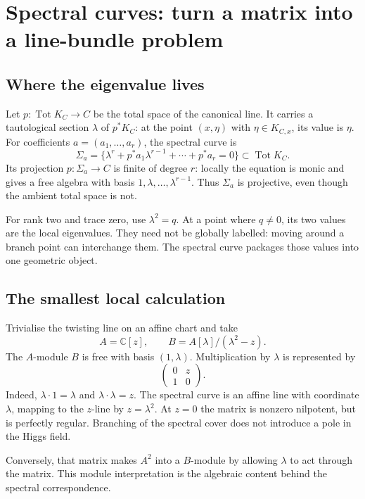 \documentclass[11pt,a4paper]{article}
\numberwithin{equation}{section}
\theoremstyle{definition}
\newcommand{\Tot}{\operatorname{Tot}}
\begin{document}
\section{Spectral curves: turn a matrix into a line-bundle problem}
\label{sec:spectral}

\subsection{Where the eigenvalue lives}
Let $p:\Tot K_C\to C$ be the total space of the canonical line.
It carries a tautological section $\lambda$ of $p^*K_C$: at the point
$(x,\eta)$ with $\eta\in K_{C,x}$, its value is $\eta$.
For coefficients $a=(a_1,\ldots,a_r)$, the spectral curve is
\begin{equation}\label{eq:spectral}
 \Sigma_a=\{\lambda^r+p^*a_1\lambda^{r-1}+\cdots+p^*a_r=0\}
 \subset\Tot K_C.
\end{equation}
Its projection $p:\Sigma_a\to C$ is finite of degree $r$: locally the
equation is monic and gives a free algebra with basis
$1,\lambda,\ldots,\lambda^{r-1}$.
Thus $\Sigma_a$ is projective, even though the ambient total space is not.

For rank two and trace zero, use $\lambda^2=q$. At a point where
$q\ne0$, its two values are the local eigenvalues. They need not be
globally labelled: moving around a branch point can interchange them.
The spectral curve packages those values into one geometric object.

\subsection{The smallest local calculation}
Trivialise the twisting line on an affine chart and take
\[
 A=\mathbb C[z],\qquad B=A[\lambda]/(\lambda^2-z).
\]
The $A$-module $B$ is free with basis $(1,\lambda)$. Multiplication
by $\lambda$ is represented by
\begin{equation}\label{eq:companion}
 \begin{pmatrix}0&z\\1&0\end{pmatrix}.
\end{equation}
Indeed, $\lambda\cdot1=\lambda$ and $\lambda\cdot\lambda=z$.
The spectral curve is an affine line with coordinate $\lambda$, mapping
to the $z$-line by $z=\lambda^2$. At $z=0$ the matrix is nonzero
nilpotent, but is perfectly regular. Branching of the spectral cover
does not introduce a pole in the Higgs field.

Conversely, that matrix makes $A^2$ into a $B$-module by allowing
$\lambda$ to act through the matrix. This module interpretation is the
algebraic content behind the spectral correspondence.
\end{document}
